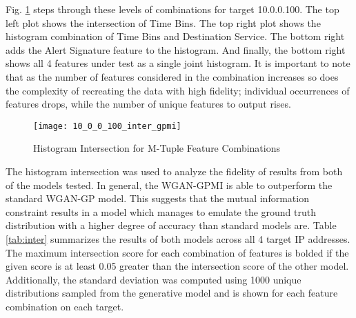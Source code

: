 Fig. \ref{fig:inter} steps through these levels of combinations for target 10.0.0.100. The top left plot shows the intersection of Time Bins. The top right plot shows the histogram combination of Time Bins and Destination Service. The bottom right adds the Alert Signature feature to the histogram. And finally, the bottom right shows all 4 features under test as a single joint histogram. It is important to note that as the number of features considered in the combination increases so does the complexity of recreating the data with high fidelity; individual occurrences of features drops, while the number of unique features to output rises.


\begin{figure}[!htbp]
	\centering
	\texttt{[image: 10\_0\_0\_100\_inter\_gpmi]}
	\caption{
		Histogram Intersection for M-Tuple Feature Combinations
	}
	\label{fig:inter}
\end{figure}

The histogram intersection was used to analyze the fidelity of results from both of the models tested. In general, the WGAN-GPMI is able to outperform the standard WGAN-GP model. This suggests that the mutual information constraint results in a model which manages to emulate the ground truth distribution with a higher degree of accuracy than standard models are. Table \ref{tab:inter} summarizes the results of both models across all 4 target IP addresses. The maximum intersection score for each combination of features is bolded if the given score is at least 0.05 greater than the intersection score of the other model. Additionally, the standard deviation was computed using 1000 unique distributions sampled from the generative model and is shown for each feature combination on each target. 

